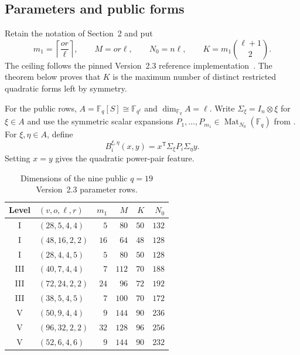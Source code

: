 \documentclass[11pt]{article}
\newcommand{\F}{\mathbb F}
\newcommand{\Mat}{\operatorname{Mat}}
\newcommand{\transpose}{\mathsf T}
\begin{document}
\subsection{Parameters and public forms}
Retain the notation of Section~2 and put
\begin{equation}
 m_1=\left\lceil\frac{or}{\ell}\right\rceil,
 \qquad M=or\ell,
 \qquad N_0=n\ell,
 \qquad K=m_1\binom{\ell+1}{2}.                    \label{eq:parameters}
\end{equation}
The ceiling follows the pinned Version~2.3 reference
implementation~\cite{SNOVA23}.  The theorem below proves that $K$ is the
maximum number of distinct restricted quadratic forms left by symmetry.

For the public rows, $A=\F_q[S]\cong\F_{q^\ell}$ and
$\dim_{\F_q}A=\ell$.  Write $\Sigma_\xi=I_n\otimes\xi$ for $\xi\in A$ and
use the symmetric scalar expansions
$P_1,\ldots,P_{m_1}\in\Mat_{N_0}(\F_q)$ from
.  For $\xi,\eta\in A$, define
\begin{equation}
  B_i^{\xi,\eta}(x,y)=x^\transpose\Sigma_\xi P_i\Sigma_\eta y.   \label{eq:base-bilinear}
\end{equation}
Setting $x=y$ gives the quadratic power-pair feature.

\begin{table}[H]
\centering
\caption{Dimensions of the nine public $q=19$ Version~2.3 parameter rows.}
\label{tab:parameters}
\small
\begin{tabular}{@{}c l r r r r@{}}
\toprule
Level & $(v,o,\ell,r)$ & $m_1$ & $M$ & $K$ & $N_0$\\
\midrule
I   & $(28,5,4,4)$  & $5$  & $80$  & $50$ & $132$\\
I   & $(48,16,2,2)$ & $16$ & $64$  & $48$ & $128$\\
I   & $(28,4,4,5)$  & $5$  & $80$  & $50$ & $128$\\
III & $(40,7,4,4)$  & $7$  & $112$ & $70$ & $188$\\
III & $(72,24,2,2)$ & $24$ & $96$  & $72$ & $192$\\
III & $(38,5,4,5)$  & $7$  & $100$ & $70$ & $172$\\
V   & $(50,9,4,4)$  & $9$  & $144$ & $90$ & $236$\\
V   & $(96,32,2,2)$ & $32$ & $128$ & $96$ & $256$\\
V   & $(52,6,4,6)$  & $9$  & $144$ & $90$ & $232$\\
\bottomrule
\end{tabular}
\end{table}
\end{document}
